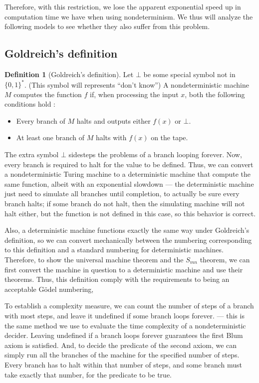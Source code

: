 \documentclass[12pt]{article}
\theoremstyle{definition}
\newtheorem{definition}{Definition}
\begin{document}
Therefore, with this restriction,
we lose the apparent exponential speed up in computation time
we have when using nondeterminism.
We thus will analyze the following models
to see whether they also suffer from this problem.

\subsection{Goldreich's definition}

\begin{definition}[Goldreich's definition]
    Let $\bot$ be some special symbol not in $\{0, 1\}^*$.
    (This symbol will represents ``don't know'')
    A nondeterministic machine $M$ computes the function $f$ if,
    when processing the input $x$,
    both the following conditions hold \cite[p.~168]{Goldreich2008}:
    \begin{itemize}
        \item Every branch of $M$ halts
            and outputs either $f(x)$ or $\bot$.
        \item At least one branch of $M$ halts with $f(x)$ on the tape.
    \end{itemize}
\end{definition}

The extra symbol $\bot$ sidesteps the problems of a branch looping forever.
Now,
every branch is required to halt for the value to be defined.
Thus,
we can convert a nondeterministic Turing machine to a deterministic machine
that compute the same function,
albeit with an exponential slowdown
--- the deterministic machine just need to simulate all branches until completion,
to actually be sure every branch halts;
if some branch do not halt,
then the simulating machine will not halt either,
but the function is not defined in this case,
so this behavior is correct.

Also, a deterministic machine functions exactly the same way under Goldreich's definition,
so we can convert mechanically
between the numbering corresponding to this definition
and a standard numbering for deterministic machines.
Therefore,
to show the universal machine theorem and the $S_{mn}$ theorem,
we can first convert the machine in question to a deterministic machine
and use their theorems.
Thus, this definition comply with the requirements to being an acceptable Gödel numbering,

To establish a complexity measure,
we can count the number of steps of a branch with most steps,
and leave it undefined if some branch loops forever.
--- this is the same method
we use to evaluate the time complexity of a nondeterministic decider.
Leaving undefined if a branch loops forever guarantees the first Blum axiom is satisfied.
And, to decide the predicate of the second axiom,
we can simply run all the branches of the machine for the specified number of steps.
Every branch has to halt within that number of steps,
and some branch must take exactly that number,
for the predicate to be true.
\end{document}
